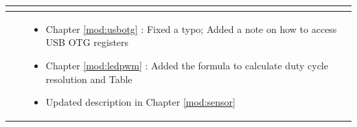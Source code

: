 \begin{longtable}[l]{ | m{2cm} | m{1.5cm} | m{12cm} | }
\begin{itemize}
    \end{itemize} \\\hline

    &  &
    \vspace{1em}
    \begin{itemize}

        \item Chapter \ref{mod:usbotg} \textit{\nameref{mod:usbotg}}: Fixed a typo; Added a note on how to access USB OTG registers %
        \item Chapter \ref{mod:ledpwm} \textit{\nameref{mod:ledpwm}}: Added the formula to calculate duty cycle resolution and Table  \textit{\nameref{tab:ledc-common-freq-res}} %
        \item Updated description in Chapter \ref{mod:sensor} \textit{\nameref{mod:sensor}}


\end{itemize}
\end{longtable}
